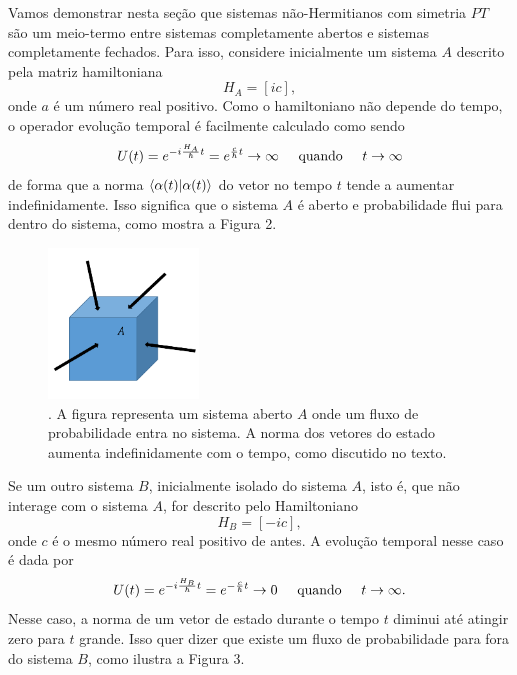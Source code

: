 \documentclass{article}
\begin{document}
Vamos demonstrar nesta seção que sistemas não-Hermitianos com simetria $PT$ são um meio-termo entre sistemas completamente abertos e sistemas completamente fechados. Para isso, considere inicialmente um sistema $A$ descrito pela matriz hamiltoniana
\begin{equation}
    H_A = [ic],
\end{equation}
onde $a$ é um número real positivo. Como o hamiltoniano não depende do tempo, o operador evolução temporal é facilmente calculado como sendo
\begin{equation}
    U(t) = e^{-i\frac{H_A}{\hbar}t} = e^{\frac{c}{\hbar}t} \rightarrow \infty \hspace{0.5cm} \text{quando} \hspace{0.5cm} t\rightarrow\infty
\end{equation}
de forma que a norma $\braket{\alpha(t)|\alpha(t)}$ do vetor no tempo $t$ tende a aumentar indefinidamente. Isso significa que o sistema $A$ é aberto e probabilidade flui para dentro do sistema, como mostra a Figura 2.
\begin{figure}[h]
\centering
\includegraphics[width=4cm]{fig2.pdf}
\captionsetup{labelsep=none}
\caption{. A figura representa um sistema aberto $A$ onde um fluxo de probabilidade entra no sistema. A norma dos vetores do estado aumenta indefinidamente com o tempo, como discutido no texto. }
\end{figure}
Se um outro sistema $B$, inicialmente isolado do sistema $A$, isto é, que não interage com o sistema $A$, for descrito pelo Hamiltoniano
\begin{equation}
    H_B = [-ic],
\end{equation}
onde $c$ é o mesmo número real positivo de antes. A evolução temporal nesse caso é dada por
\begin{equation}
    U(t) = e^{-i\frac{H_B}{\hbar}t} = e^{-\frac{c}{\hbar}t} \rightarrow 0 \hspace{0.5cm} \text{quando} \hspace{0.5cm} t\rightarrow\infty.
\end{equation}
Nesse caso, a norma de um vetor de estado durante o tempo $t$ diminui até atingir zero para $t$ grande. Isso quer dizer que existe um fluxo de probabilidade para fora do sistema $B$, como ilustra a Figura 3.
\end{document}
